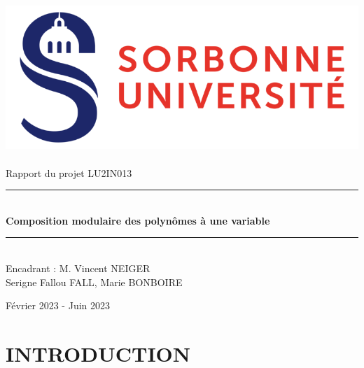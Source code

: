 \documentclass[a4paper]{article}
\begin{document}
\thispagestyle{plain}

\begin{titlepage}
    \begin{center}

        \bigskip
        \includegraphics[scale=0.5]{logo_su.jpg}~\\[4cm]

        {\LARGE Rapport du projet LU2IN013}\\[0.3cm]
        \rule{\linewidth}{0.5mm} \\[0.6cm]
        {\huge \textbf{Composition modulaire des polynômes à une variable}}\\[0.4cm]
        \rule{\linewidth}{0.5mm} \\[1cm]
        {\large Encadrant : M. Vincent NEIGER}\\[5cm]

        {\Large Serigne Fallou FALL, Marie BONBOIRE}
        
        \vfill
        Février 2023 - Juin 2023


    \end{center}
\end{titlepage}

\newpage

\tableofcontents

\newpage


\section{INTRODUCTION}
\end{document}
